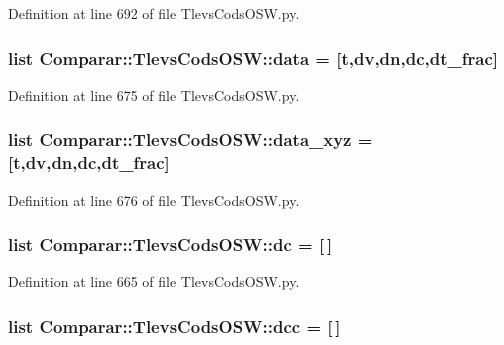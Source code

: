 \-Definition at line 692 of file \-Tlevs\-Cods\-O\-S\-W.\-py.

\subsubsection[{data}]{\setlength{\rightskip}{0pt plus 5cm}list {\bf \-Comparar\-::\-Tlevs\-Cods\-O\-S\-W\-::data} = [{\bf t},{\bf dv},{\bf dn},{\bf dc},{\bf dt\-\_\-frac}]}\label{namespace_comparar_1_1_tlevs_cods_o_s_w_a0e4d67c3448069473ffece91e5e422b1}


\-Definition at line 675 of file \-Tlevs\-Cods\-O\-S\-W.\-py.

\subsubsection[{data\-\_\-xyz}]{\setlength{\rightskip}{0pt plus 5cm}list {\bf \-Comparar\-::\-Tlevs\-Cods\-O\-S\-W\-::data\-\_\-xyz} = [{\bf t},{\bf dv},{\bf dn},{\bf dc},{\bf dt\-\_\-frac}]}\label{namespace_comparar_1_1_tlevs_cods_o_s_w_a841e85546174cadb738eead62b51ae0c}


\-Definition at line 676 of file \-Tlevs\-Cods\-O\-S\-W.\-py.

\subsubsection[{dc}]{\setlength{\rightskip}{0pt plus 5cm}list {\bf \-Comparar\-::\-Tlevs\-Cods\-O\-S\-W\-::dc} = [$\,$]}\label{namespace_comparar_1_1_tlevs_cods_o_s_w_a26a82f2f3640b3d6352b6e1f48f28b2a}


\-Definition at line 665 of file \-Tlevs\-Cods\-O\-S\-W.\-py.

\subsubsection[{dcc}]{\setlength{\rightskip}{0pt plus 5cm}list {\bf \-Comparar\-::\-Tlevs\-Cods\-O\-S\-W\-::dcc} = [$\,$]}\label{namespace_comparar_1_1_tlevs_cods_o_s_w_afa289d4d809218bc536e6e4442952180}


